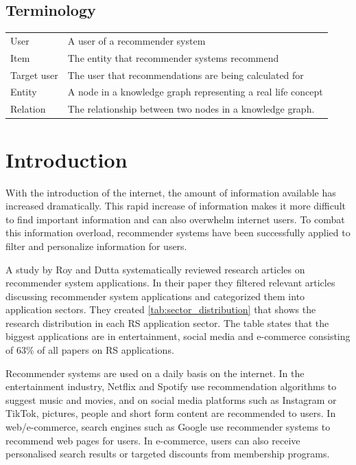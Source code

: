 \documentclass[english, 12pt, a4paper, sci, utf8, a-2b, online]{aaltothesis}
\begin{document}
\subsection*{Terminology}

\begin{tabular}{ll}
User                    & A user of a recommender system \\
Item                    & The entity that recommender systems recommend \\
Target user             & The user that recommendations are being calculated for \\
Entity                  & A node in a knowledge graph representing a real life concept \\
Relation                & The relationship between two nodes in a knowledge graph. \\
\end{tabular}

\cleardoublepage

\setcounter{page}{1}    %

\section{Introduction}
\label{sec:intro}


With the introduction of the internet, the amount of information available has increased dramatically. This rapid increase of information makes it more difficult to find important information and can also overwhelm internet users. To combat this information overload, recommender systems have been successfully applied to filter and personalize information for users. 

A study by Roy and Dutta \parencite{roy2022systematic} systematically reviewed research articles on recommender system applications. In their paper they filtered relevant articles discussing recommender system applications and categorized them into application sectors. They created \autoref{tab:sector_distribution} that shows the research distribution in each RS application sector. The table states that the biggest applications are in entertainment, social media and e-commerce consisting of 63\% of all papers on RS applications.



Recommender systems are used on a daily basis on the internet. In the entertainment industry, Netflix and Spotify use recommendation algorithms to suggest music and movies, and on social media platforms such as Instagram or TikTok, pictures, people and short form content are recommended to users. In web/e-commerce, search engines such as Google use recommender systems to recommend web pages for users. In e-commerce, users can also receive personalised search results or targeted discounts from membership programs.
\end{document}
